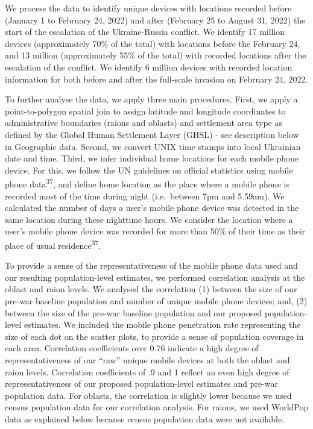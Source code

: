 \documentclass[
  11pt,
]{article}
\begin{document}
We process the data to identify unique devices with locations recorded
before (January 1 to February 24, 2022) and after (February 25 to August
31, 2022) the start of the escalation of the Ukraine-Russia conflict. We
identify 17 million devices (approximately 70\% of the total) with
locations before the February 24, and 13 million (approximately 55\% of
the total) with recorded locations after the escalation of the conflict.
We identify 6 million devices with recorded location information for
both before and after the full-scale invasion on February 24, 2022.

To further analyse the data, we apply three main procedures. First, we
apply a point-to-polygon spatial join to assign latitude and longitude
coordinates to administrative boundaries (raions and oblasts) and
settlement area type as defined by the Global Human Settlement Layer
(GHSL) - see description below in Geographic data. Second, we convert
UNIX time stamps into local Ukrainian date and time. Third, we infer
individual home locations for each mobile phone device. For this, we
follow the UN guidelines on official statistics using mobile phone
data\textsuperscript{37}, and define home location as the place where a
mobile phone is recorded most of the time during night (i.e.~between 7pm
and 5.59am). We calculated the number of days a user's mobile phone
device was detected in the same location during these nighttime hours.
We consider the location where a user's mobile phone device was recorded
for more than 50\% of their time as their place of usual
residence\textsuperscript{37}.

To provide a sense of the representativeness of the mobile phone data
used and our resulting population-level estimates, we performed
correlation analysis at the oblast and raion levels. We analysed the
correlation (1) between the size of our pre-war baseline population and
number of unique mobile phone devices; and, (2) between the size of the
pre-war baseline population and our proposed population-level estimates.
We included the mobile phone penetration rate representing the size of
each dot on the scatter plots, to provide a sense of population coverage
in each area. Correlation coefficients over 0.76 indicate a high degree
of representativeness of our ``raw'' unique mobile devices at both the
oblast and raion levels. Correlation coefficients of .9 and 1 reflect an
even high degree of representativeness of our proposed population-level
estimates and pre-war population data. For oblasts, the correlation is
slightly lower because we used census population data for our
correlation analysis. For raions, we used WorldPop data as explained
below because census population data were not available.
\end{document}
